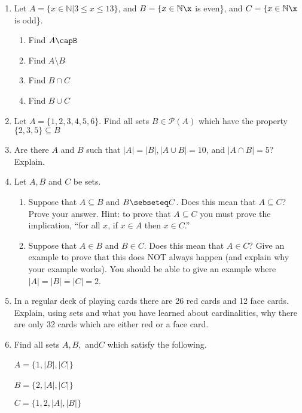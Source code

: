 \documentclass[11pt, a4paper]{article}
\newcommand\setItemNumber[1]{\setcounter{enumi}{\numexpr#1-1\relax}}
\begin{document}
\begin{enumerate}
    \setItemNumber{10}
    \item Let $A = \{x\in\mathbb{N}| 3\leq x\leq13\}$, and $B = \{x\in\mathbb{N}\x$ is even\}, and $C = \{x\in\mathbb{N}\x$ is odd\}.
        \begin{enumerate}
            \item Find $A\capB$
            \item Find $A\setminus B$
            \item Find $B\cap C$
            \item Find $B\cup C$
        \end{enumerate}

    \setItemNumber{19}
    \item Let $A = \{1,2,3,4,5,6\}$. Find all sets $B\in\mathcal{P}(A)$ which have the property $\{2,3,5\}\subseteq B$

    \setItemNumber{22}
    \item Are there $A$ and $B$ such that $|A| = |B|,|A\cup B| = 10$, and $|A\cap B| = 5$?Explain.


    \setItemNumber{25}
    \item Let $A, B$ and $C$ be sets.
        \begin{enumerate}
            \item Suppose that $A \subseteq B$ and $B\sebseteq C$. Does this mean that $A \subseteq C$? Prove your answer. Hint: to prove that $A\subseteq C$ you must prove the implication, “for all $x$, if $x\in A$ then $x\in C$.”
            \item Suppose that $A\in B$ and $B\in C$. Does this mean that $A\in C$? Give an example to prove that this does NOT always happen (and explain why your example works). You should be able to give an example where $|A|=|B|=|C|=2$.
        \end{enumerate}

    \setItemNumber{26}
    \item In a regular deck of playing cards there are 26 red cards and 12 face cards. Explain, using sets and what you have learned about cardinalities, why there are only 32 cards which are either red or a face card.

    \setItemNumber{30}
    \item Find all sets $A,B,$ and$C$ which satisfy the following.\
       
        \centering $A=\{1,|B|,|C|\}$\

        \centering $B=\{2,|A|,|C|\}$\

        \centering $C=\{1,2,|A|,|B|\}$

\end{enumerate}
\end{document}
